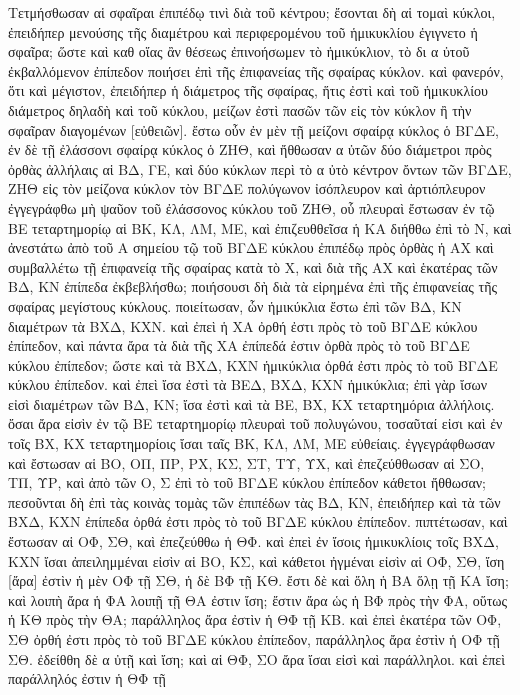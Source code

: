 \begin{Parallel}{}{}
{{\greekfont Τετμήσθωσαν αἱ σφαῖραι ἐπιπέδῳ τινὶ διὰ τοῦ κέντρου; ἔσονται δὴ αἱ τομαὶ κύκλοι,
ἐπειδήπερ μενούσης τῆς διαμέτρου καὶ περιφερομένου τοῦ ἡμικυκλίου ἐγιγνετο ἡ σφαῖρα; ὥστε καὶ καθ
οἵας ἂν θέσεως ἐπινοήσωμεν τὸ ἡμικύκλιον, τὸ δι α ὐτοῦ ἐκβαλλόμενον ἐπίπεδον ποιήσει ἐπὶ
τῆς ἐπιφανείας τῆς σφαίρας κύκλον. καὶ φανερόν, ὅτι καὶ μέγιστον, ἐπειδήπερ ἡ διάμετρος τῆς
σφαίρας, ἥτις ἐστὶ καὶ τοῦ ἡμικυκλίου διάμετρος
 δηλαδὴ
καὶ τοῦ κύκλου, μείζων ἐστὶ πασῶν τῶν εἰς τὸν κύκλον ἢ τὴν σφαῖραν διαγομένων [εὐθειῶν]. ἔστω
οὖν ἐν μὲν τῇ μείζονι σφαίρᾳ κύκλος ὁ ΒΓΔΕ, ἐν δὲ τῇ ἐλάσσονι σφαίρᾳ κύκλος ὁ ΖΗΘ, καὶ ἤθθωσαν α ὐτῶν
δύο διάμετροι πρὸς ὀρθὰς ἀλλήλαις αἱ ΒΔ, ΓΕ, καὶ δύο κύκλων περὶ τὸ α ὐτὸ κέντρον ὄντων τῶν ΒΓΔΕ, ΖΗΘ
εἰς τὸν μείζονα κύκλον τὸν ΒΓΔΕ πολύγωνον ἰσόπλευρον καὶ ἀρτιόπλευρον ἐγγεγράφθω μὴ ψαῦον
τοῦ ἐλάσσονος κύκλου τοῦ ΖΗΘ, οὗ πλευραὶ ἔστωσαν ἐν τῷ ΒΕ  τεταρτημορίῳ αἱ ΒΚ, ΚΛ, ΛΜ, ΜΕ, καὶ
ἐπιζευθθεῖσα ἡ ΚΑ διήθθω ἐπὶ τὸ Ν, καὶ ἀνεστάτω ἀπὸ τοῦ Α σημείου τῷ τοῦ ΒΓΔΕ κύκλου
ἐπιπέδῳ πρὸς ὀρθὰς ἡ ΑΧ καὶ συμβαλλέτω τῇ ἐπιφανείᾳ τῆς σφαίρας κατὰ τὸ Χ, καὶ διὰ τῆς ΑΧ καὶ ἑκατέρας
τῶν ΒΔ, ΚΝ ἐπίπεδα ἐκβεβλήσθω; ποιήσουσι δὴ διὰ τὰ εἰρημένα
ἐπὶ τῆς ἐπιφανείας τῆς σφαίρας μεγίστους κύκλους. ποιείτωσαν, ὧν ἡμικύκλια ἔστω ἐπὶ τῶν ΒΔ, ΚΝ
διαμέτρων τὰ ΒΧΔ, ΚΧΝ. καὶ ἐπεὶ ἡ ΧΑ ὀρθή ἐστι πρὸς τὸ τοῦ ΒΓΔΕ κύκλου ἐπίπεδον, καὶ
πάντα ἄρα τὰ διὰ τῆς ΧΑ ἐπίπεδά ἐστιν ὀρθὰ πρὸς τὸ τοῦ
ΒΓΔΕ κύκλου ἐπίπεδον; ὥστε καὶ τὰ ΒΧΔ, ΚΧΝ ἡμικύκλια ὀρθά ἐστι πρὸς τὸ τοῦ ΒΓΔΕ κύκλου ἐπίπεδον.
καὶ ἐπεὶ ἴσα ἐστὶ τὰ ΒΕΔ, ΒΧΔ, ΚΧΝ ἡμικύκλια; ἐπὶ γὰρ ἴσων εἰσὶ διαμέτρων τῶν ΒΔ, ΚΝ; ἴσα
ἐστὶ καὶ τὰ ΒΕ, ΒΧ, ΚΧ τεταρτημόρια ἀλλήλοις. ὄσαι ἄρα εἰσὶν ἐν τῷ ΒΕ τεταρτημορίῳ
πλευραὶ τοῦ πολυγώνου, τοσαῦταί εἰσι καὶ ἐν τοῖς ΒΧ, ΚΧ τεταρτημορίοις ἴσαι ταῖς ΒΚ, ΚΛ, ΛΜ, ΜΕ εὐθείαις.
ἐγγεγράφθωσαν καὶ ἔστωσαν αἱ ΒΟ, ΟΠ, ΠΡ, ΡΧ, ΚΣ, ΣΤ, ΤΥ, ΥΧ,  καὶ ἐπεζεύθθωσαν αἱ ΣΟ, ΤΠ,
ΥΡ, καὶ ἀπὸ τῶν Ο, Σ ἐπὶ τὸ τοῦ ΒΓΔΕ κύκλου ἐπίπεδον κάθετοι ἤθθωσαν; πεσοῦνται
δὴ ἐπὶ τὰς κοινὰς τομὰς τῶν ἐπιπέδων τὰς ΒΔ, ΚΝ, ἐπειδήπερ καὶ τὰ τῶν ΒΧΔ, ΚΧΝ ἐπίπεδα ὀρθά
ἐστι πρὸς τὸ τοῦ ΒΓΔΕ κύκλου ἐπίπεδον. πιπτέτωσαν, καὶ ἔστωσαν αἱ ΟΦ, ΣΘ, καὶ ἐπεζεύθθω ἡ ΘΦ.
καὶ ἐπεὶ ἐν ἴσοις ἡμικυκλίοις τοῖς ΒΧΔ, ΚΧΝ ἴσαι ἀπειλημμέναι εἰσὶν αἱ ΒΟ, ΚΣ,
καὶ κάθετοι ἠγμέναι εἰσὶν αἱ ΟΦ, ΣΘ, ἴση [ἄρα] ἐστὶν ἡ μὲν ΟΦ τῇ ΣΘ, ἡ δὲ ΒΦ
τῇ ΚΘ. ἔστι δὲ καὶ ὅλη ἡ ΒΑ ὅλῃ τῇ ΚΑ ἴση; καὶ λοιπὴ ἄρα ἡ ΦΑ λοιπῇ τῇ ΘΑ ἐστιν
ἴση; ἔστιν ἄρα ὡς ἡ ΒΦ πρὸς τὴν ΦΑ, οὕτως ἡ ΚΘ πρὸς τὴν ΘΑ; παράλληλος ἄρα ἐστὶν ἡ ΘΦ τῇ ΚΒ. καὶ
ἐπεὶ ἑκατέρα τῶν ΟΦ, ΣΘ ὀρθή ἐστι πρὸς τὸ τοῦ ΒΓΔΕ κύκλου ἐπίπεδον, παράλληλος ἄρα ἐστὶν ἡ ΟΦ τῇ ΣΘ. ἐδείθθη
δὲ α ὐτῇ καὶ ἴση; καὶ αἱ ΘΦ, ΣΟ ἄρα ἴσαι εἰσὶ καὶ παράλληλοι. καὶ ἐπεὶ παράλληλός ἐστιν ἡ ΘΦ τῇ
}}
\end{Parallel}
